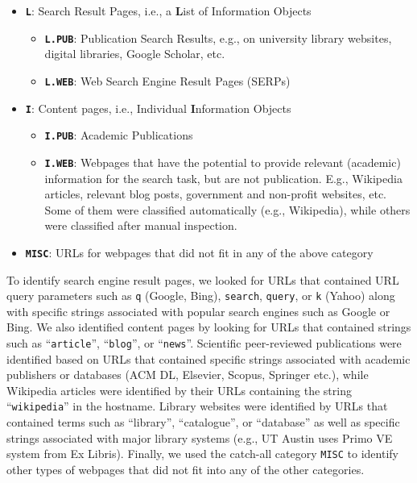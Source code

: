 \documentclass[letterpaper, nobind]{templates/ociamthesis}
\providecommand{\tightlist}{%
  \setlength{\itemsep}{0pt}\setlength{\parskip}{0pt}}
\begin{document}
\begin{itemize}
\tightlist
\item
  \textbf{\texttt{L}}: Search Result Pages, i.e., a \textbf{L}ist of Information Objects

  \begin{itemize}
  \tightlist
  \item
    \textbf{\texttt{L.PUB}}: Publication Search Results, e.g., on university library websites, digital libraries, Google Scholar, etc.
  \item
    \textbf{\texttt{L.WEB}}: Web Search Engine Result Pages (SERPs)
  \end{itemize}
\item
  \textbf{\texttt{I}}: Content pages, i.e., Individual \textbf{I}nformation Objects

  \begin{itemize}
  \tightlist
  \item
    \textbf{\texttt{I.PUB}}: Academic Publications
  \item
    \textbf{\texttt{I.WEB}}: Webpages that have the potential to provide relevant (academic) information for the search task, but are not publication. E.g., Wikipedia articles, relevant blog posts, government and non-profit websites, etc. Some of them were classified automatically (e.g., Wikipedia), while others were classified after manual inspection.
  \end{itemize}
\item
  \textbf{\texttt{MISC}}: URLs for webpages that did not fit in any of the above category
\end{itemize}

To identify search engine result pages, we looked for URLs that contained URL query parameters such as \texttt{q} (Google, Bing), \texttt{search}, \texttt{query}, or \texttt{k} (Yahoo) along with specific strings associated with popular search engines such as Google or Bing.
We also identified content pages by looking for URLs that contained strings such as ``\texttt{article}'', ``\texttt{blog}'', or ``\texttt{news}''.
Scientific peer-reviewed publications were identified based on URLs that contained specific strings associated with academic publishers or databases (ACM DL, Elsevier, Scopus, Springer etc.), while Wikipedia articles were identified by their URLs containing the string ``\texttt{wikipedia}'' in the hostname.
Library websites were identified by URLs that contained terms such as ``library'', ``catalogue'', or ``database'' as well as specific strings associated with major library systems (e.g., UT Austin uses Primo VE system from Ex Libris). Finally, we used the catch-all category \texttt{MISC} to identify other types of webpages that did not fit into any of the other categories.
\end{document}
